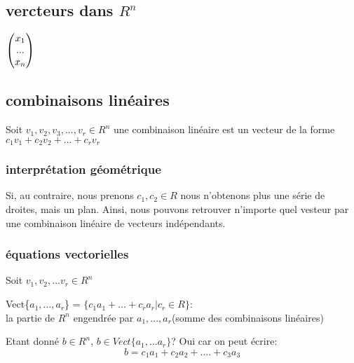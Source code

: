 \documentclass[a4paper,10pt]{article}
\begin{document}
\subsection{vercteurs dans $R^n$}

\begin{math}
\begin{pmatrix}
 x_1\cr
 ...\cr
 x_n
\end{pmatrix}
\end{math}

\subsection{combinaisons linéaires}
Soit $v_1,v_2,v_3,...,v_r\in R^n$
\newline
une combinaison linéaire est un vecteur de la forme $c_1 v_1 + c_2 v_2 +... + c_r v_r$
\paragraph{}
\subsubsection{interprétation géométrique}


Si, au contraire, nous prenons $c_1,c_2\in R$ nous n'obtenons plus une série de droites, mais un plan. Ainsi, nous pouvons retrouver n'importe quel vesteur par une combinaison linéaire de vecteurs indépendants.

\subsubsection{équations vectorielles}
 Soit $v_1,v_2,...v_r\in R^n$
 \begin{description}
  \item Vect\{$a_1,...,a_r$\} = $ \{c_1a_1+...+c_ra_r| c_r\in R\}$:\\{la partie de $R^n$ engendrée par $a_1,...,a_r$(somme des combinaisons linéaires)}
 \end{description}
Etant donné $ b\in R^n$, $b\in Vect\{a_1,...a_r\}$? Oui car on peut écrire:
\[b = c_1a_1+c_2a_2+....+c_3a_3\]
\end{document}
